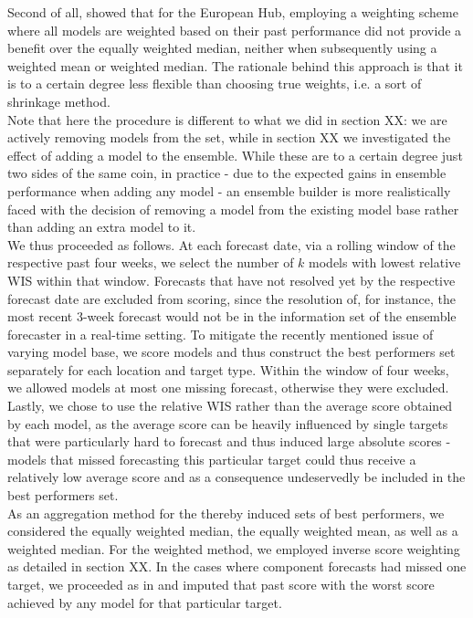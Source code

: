 Second of all, \cite{sherratt_european_2022} showed that for the European Hub, employing a weighting scheme where all models are weighted based on their past performance did not provide a benefit over the equally weighted median, neither when subsequently using a weighted mean or weighted median.
The rationale behind this approach is that it is to a certain degree less flexible than choosing true weights, i.e. a sort of shrinkage method.\\
Note that here the procedure is different to what we did in section XX: we are actively removing models from the set, while in section XX we investigated the effect of adding a model to the ensemble. While these are to a certain degree just two sides of the same coin, in practice - due to the expected gains in ensemble performance when adding any model - an ensemble builder is more realistically faced with the decision of removing a model from the existing model base rather than adding an extra model to it.\\
We thus proceeded as follows. At each forecast date, via a rolling window of the respective past four weeks, we select the number of $k$ models with lowest relative WIS within that window. Forecasts that have not resolved yet by the respective forecast date are excluded from scoring, since the resolution of, for instance, the most recent 3-week forecast would not be in the information set of the ensemble forecaster in a real-time setting. To mitigate the recently mentioned issue of varying model base, we score models and thus construct the best performers set separately for each location and target type. Within the window of four weeks, we allowed models at most one missing forecast, otherwise they were excluded. Lastly, we chose to use the relative WIS rather than the average score obtained by each model, as the average score can be heavily influenced by single targets that were particularly hard to forecast and thus induced large absolute scores - models that missed forecasting this particular target could thus receive a relatively low average score and as a consequence undeservedly be included in the best performers set.\\
As an aggregation method for the thereby induced sets of best performers, we considered the equally weighted median, the equally weighted mean, as well as a weighted median. For the weighted method, we employed inverse score weighting as detailed in section XX. In the cases where component forecasts had missed one target, we proceeded as in \citep{bracher_evaluating_2021} and imputed that past score with the worst score achieved by any model for that particular target.\\

